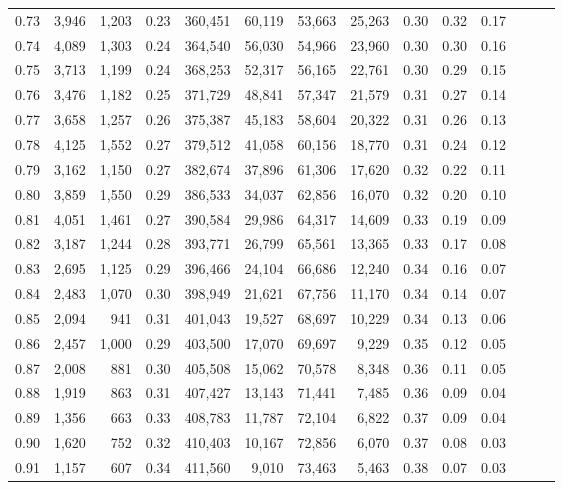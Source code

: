 \begin{tabular}{rrrrrrrrrrrrrr}
0.73 &  3,946 &  1,203 &  0.23 &  360,451 &   60,119 &  53,663 &  25,263 &  0.30 &  0.32 &      0.17 \\
0.74 &  4,089 &  1,303 &  0.24 &  364,540 &   56,030 &  54,966 &  23,960 &  0.30 &  0.30 &      0.16 \\
0.75 &  3,713 &  1,199 &  0.24 &  368,253 &   52,317 &  56,165 &  22,761 &  0.30 &  0.29 &      0.15 \\
0.76 &  3,476 &  1,182 &  0.25 &  371,729 &   48,841 &  57,347 &  21,579 &  0.31 &  0.27 &      0.14 \\
0.77 &  3,658 &  1,257 &  0.26 &  375,387 &   45,183 &  58,604 &  20,322 &  0.31 &  0.26 &      0.13 \\
0.78 &  4,125 &  1,552 &  0.27 &  379,512 &   41,058 &  60,156 &  18,770 &  0.31 &  0.24 &      0.12 \\
0.79 &  3,162 &  1,150 &  0.27 &  382,674 &   37,896 &  61,306 &  17,620 &  0.32 &  0.22 &      0.11 \\
0.80 &  3,859 &  1,550 &  0.29 &  386,533 &   34,037 &  62,856 &  16,070 &  0.32 &  0.20 &      0.10 \\
0.81 &  4,051 &  1,461 &  0.27 &  390,584 &   29,986 &  64,317 &  14,609 &  0.33 &  0.19 &      0.09 \\
0.82 &  3,187 &  1,244 &  0.28 &  393,771 &   26,799 &  65,561 &  13,365 &  0.33 &  0.17 &      0.08 \\
0.83 &  2,695 &  1,125 &  0.29 &  396,466 &   24,104 &  66,686 &  12,240 &  0.34 &  0.16 &      0.07 \\
0.84 &  2,483 &  1,070 &  0.30 &  398,949 &   21,621 &  67,756 &  11,170 &  0.34 &  0.14 &      0.07 \\
0.85 &  2,094 &    941 &  0.31 &  401,043 &   19,527 &  68,697 &  10,229 &  0.34 &  0.13 &      0.06 \\
0.86 &  2,457 &  1,000 &  0.29 &  403,500 &   17,070 &  69,697 &   9,229 &  0.35 &  0.12 &      0.05 \\
0.87 &  2,008 &    881 &  0.30 &  405,508 &   15,062 &  70,578 &   8,348 &  0.36 &  0.11 &      0.05 \\
0.88 &  1,919 &    863 &  0.31 &  407,427 &   13,143 &  71,441 &   7,485 &  0.36 &  0.09 &      0.04 \\
0.89 &  1,356 &    663 &  0.33 &  408,783 &   11,787 &  72,104 &   6,822 &  0.37 &  0.09 &      0.04 \\
0.90 &  1,620 &    752 &  0.32 &  410,403 &   10,167 &  72,856 &   6,070 &  0.37 &  0.08 &      0.03 \\
0.91 &  1,157 &    607 &  0.34 &  411,560 &    9,010 &  73,463 &   5,463 &  0.38 &  0.07 &      0.03 \\

\end{tabular}
